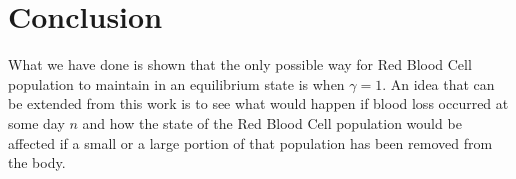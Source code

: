 \section{Conclusion}

What we have done is shown that the only possible way for Red Blood Cell population to maintain in an equilibrium state is when $\gamma = 1$. An idea that can be extended from this work is to see what would happen if blood loss occurred at some day $n$ and how the state of the Red Blood Cell population would be affected if a small or a large portion of that population has been removed from the body.

